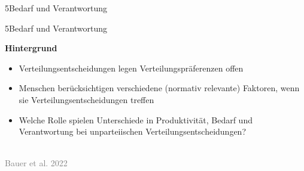 \documentclass[xcolor=table,9pt,aspectratio=169]{beamer}
\begin{document}
\begin{frame}
\begin{overlayarea}{\textwidth}{0.81\paperheight}{
   \vspace*{11mm}
   \textcolor{uolblue}
   {5\hspace*{1em}Bedarf und Verantwortung}
}
\end{overlayarea}
\end{frame}


\begin{frame}{\vspace*{10mm}5\hspace*{1em}Bedarf und Verantwortung}
\begin{multicols}{2}
   \textbf{Hintergrund}\\
   \medskip
   \begin{itemize}
      \item Verteilungsentscheidungen legen Verteilungspräferenzen offen
      \item Menschen berücksichtigen verschiedene (normativ relevante) Faktoren, wenn sie Verteilungsentscheidungen treffen
      \item Welche Rolle spielen Unterschiede in Produktivität, Bedarf und Verantwortung bei unparteiischen Verteilungsentscheidungen?
   \end{itemize}
   \vfill
   \begin{center}
      \\
      \textcolor{gray}{Bauer et al. 2022}
   \end{center}
\end{multicols}
\end{frame}
\end{document}
